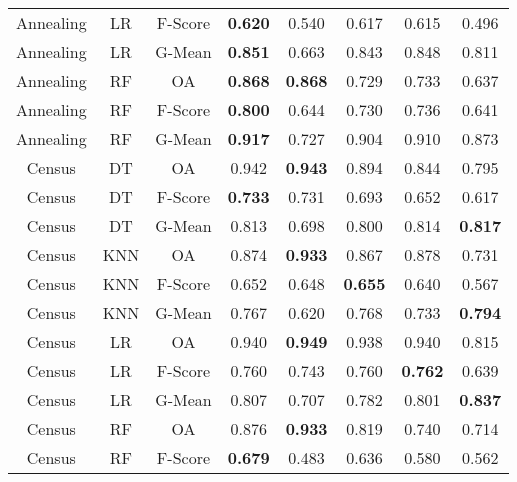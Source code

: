 \begin{longtable}{cccccccc}
         Annealing &         LR & F-Score & \textbf{0.620} &          0.540 &          0.617 &          0.615 &          0.496 \\
         Annealing &         LR &  G-Mean & \textbf{0.851} &          0.663 &          0.843 &          0.848 &          0.811 \\
         Annealing &         RF &      OA & \textbf{0.868} & \textbf{0.868} &          0.729 &          0.733 &          0.637 \\
         Annealing &         RF & F-Score & \textbf{0.800} &          0.644 &          0.730 &          0.736 &          0.641 \\
         Annealing &         RF &  G-Mean & \textbf{0.917} &          0.727 &          0.904 &          0.910 &          0.873 \\
            Census &         DT &      OA &          0.942 & \textbf{0.943} &          0.894 &          0.844 &          0.795 \\
            Census &         DT & F-Score & \textbf{0.733} &          0.731 &          0.693 &          0.652 &          0.617 \\
            Census &         DT &  G-Mean &          0.813 &          0.698 &          0.800 &          0.814 & \textbf{0.817} \\
            Census &        KNN &      OA &          0.874 & \textbf{0.933} &          0.867 &          0.878 &          0.731 \\
            Census &        KNN & F-Score &          0.652 &          0.648 & \textbf{0.655} &          0.640 &          0.567 \\
            Census &        KNN &  G-Mean &          0.767 &          0.620 &          0.768 &          0.733 & \textbf{0.794} \\
            Census &         LR &      OA &          0.940 & \textbf{0.949} &          0.938 &          0.940 &          0.815 \\
            Census &         LR & F-Score &          0.760 &          0.743 &          0.760 & \textbf{0.762} &          0.639 \\
            Census &         LR &  G-Mean &          0.807 &          0.707 &          0.782 &          0.801 & \textbf{0.837} \\
            Census &         RF &      OA &          0.876 & \textbf{0.933} &          0.819 &          0.740 &          0.714 \\
            Census &         RF & F-Score & \textbf{0.679} &          0.483 &          0.636 &          0.580 &          0.562 \\

\end{longtable}
